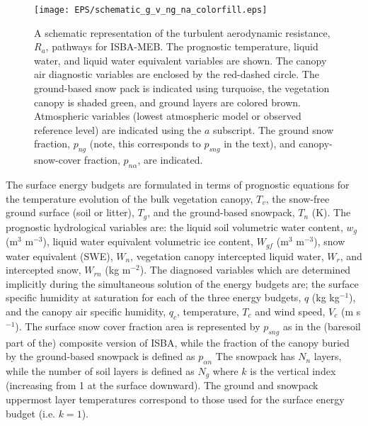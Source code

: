 \begin{figure}[!b]
\centerline{ 
\texttt{[image: EPS/schematic\_g\_v\_ng\_na\_colorfill.eps]}}
\caption{
A schematic representation of 
the turbulent aerodynamic resistance, $R_{a}$, pathways for
ISBA-MEB. The prognostic temperature, liquid water, and liquid water
equivalent variables are shown.
The canopy air diagnostic variables are enclosed by the red-dashed circle.
The ground-based snow pack is indicated using
turquoise, the vegetation canopy is shaded green,
and ground layers are colored brown.
Atmospheric variables (lowest atmospheric 
model or observed reference level) are indicated using
the $a$ subscript.
The ground snow fraction, $p_{ng}$ (note, this corresponds to
$p_{sng}$ in the text), and canopy-snow-cover 
fraction, $p_{n\alpha}$, are indicated.
}
\label{fig:schematic_meb}
\end{figure}


The surface energy budgets are formulated in terms of prognostic
equations for the temperature evolution of the bulk vegetation canopy, $T_v$, 
the snow-free ground surface (soil or litter), $T_g$, and the
ground-based
snowpack, $T_n$ (K). The prognostic hydrological variables
are: the liquid soil volumetric water content, $w_g$ (m$^3$ m$^{-3}$),
liquid water equivalent volumetric
ice content, $W_{gf}$ (m$^3$ m$^{-3}$), snow water equivalent
(SWE), $W_n$,
vegetation canopy intercepted liquid water, $W_r$, and intercepted
snow, $W_{rn}$ (kg m$^{-2}$).  
%
The diagnosed variables which are determined implicitly during the
simultaneous solution of the energy budgets are; 
the surface specific humidity at saturation 
for each of the three energy budgets, $q$ (kg
kg$^{-1}$), and the canopy air specific humidity, $q_c$, temperature,
$T_c$ and wind speed, $V_c$ (m s$^{-1}$).
%
The surface snow cover fraction
area is represented by $p_{sng}$ as in the (baresoil part of the) 
composite version of ISBA, 
while the fraction of the canopy
buried by the ground-based snowpack is defined as $p_{\alpha n}$
%
The snowpack has $N_n$ layers, while the number of soil
layers is defined as $N_g$ where $k$ is the vertical index (increasing
from 1 at the surface downward). The ground and snowpack uppermost
layer temperatures 
correspond to those used for the surface energy budget (i.e. $k=1$).
%

